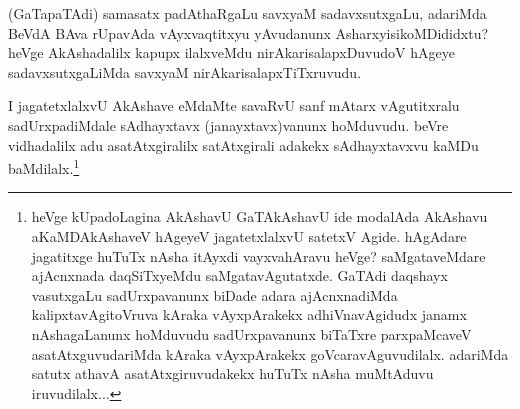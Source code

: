 \begin{artha}
(GaTapaTAdi) samasatx padAthaRgaLu savxyaM sadavxsutxgaLu, adariMda BeVdA BAva rUpavAda vAyxvaqtitxyu yAvudanunx AsharxyisikoMDididxtu? heVge AkAshadalilx kapupx ilalxveMdu nirAkarisalapxDuvudoV hAgeye sadavxsutxgaLiMda savxyaM nirAkarisalapxTiTxruvudu.
\end{artha}

\begin{artha}
I jagatetxlalxvU AkAshave eMdaMte savaRvU sanf mAtarx vAgutitxralu sadUrxpadiMdale sAdhayxtavx (janayxtavx)vanunx hoMduvudu. beVre vidhadalilx adu asatAtxgiralilx satAtxgirali adakekx sAdhayxtavxvu kaMDu baMdilalx.\footnote{heVge kUpadoLagina AkAshavU GaTAkAshavU ide modalAda AkAshavu aKaMDAkAshaveV hAgeyeV jagatetxlalxvU satetxV Agide. hAgAdare jagatitxge huTuTx nAsha itAyxdi vayxvahAravu heVge? saMgataveMdare ajAcnxnada daqSiTxyeMdu saMgatavAgutatxde. GaTAdi daqshayx vasutxgaLu sadUrxpavanunx biDade adara ajAcnxnadiMda kalipxtavAgitoVruva kAraka vAyxpArakekx adhiVnavAgidudx janamx nAshagaLanunx hoMduvudu sadUrxpavanunx biTaTxre parxpaMcaveV asatAtxguvudariMda kAraka vAyxpArakekx goVcaravAguvudilalx. adariMda satutx athavA asatAtxgiruvudakekx huTuTx nAsha muMtAduvu iruvudilalx...}
\end{artha}
